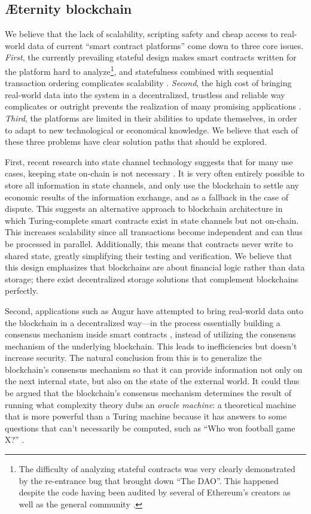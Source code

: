 \documentclass[a4paper, 10pt, conference]{ieeeconf}      %
\begin{document}
\begin{draft}
\section{Æternity blockchain}
We believe that the lack of scalability, scripting safety and cheap access to real-world data of current ``smart contract platforms'' come down to three core issues. \emph{First}, the currently prevailing stateful design makes smart contracts written for the platform hard to analyze\footnote{The difficulty of analyzing stateful contracts was very clearly demonstrated by the re-entrance bug that brought down ``The DAO''. This happened despite the code having been audited by several of Ethereum's creators as well as the general community \source.}, and statefulness combined with sequential transaction ordering complicates scalability \source. \emph{Second}, the high cost of bringing real-world data into the system in a decentralized, trustless and reliable way complicates or outright prevents the realization of many promising applications \source. \emph{Third}, the platforms are limited in their abilities to update themselves, in order to adapt to new technological or economical knowledge. We believe that each of these three problems have clear solution paths that should be explored.

First, recent research into state channel technology suggests that for many use cases, keeping state on-chain is not necessary \source. It is very often entirely possible to store all information in state channels, and only use the blockchain to settle any economic results of the information exchange, and as a fallback in the case of dispute. This suggests an alternative approach to blockchain architecture in which Turing-complete smart contracts exist in state channels but not on-chain. This increases scalability since all transactions become independent and can thus be processed in parallel. Additionally, this means that contracts never write to shared state, greatly simplifying their testing and verification. We believe that this design emphasizes that blockchains are about financial logic rather than data storage; there exist decentralized storage solutions that complement blockchains perfectly.

Second, applications such as Augur have attempted to bring real-world data onto the blockchain in a decentralized way---in the process essentially building a consensus mechanism inside smart contracts \cite{augur}, instead of utilizing the consensus mechanism of the underlying blockchain. This leads to inefficiencies but doesn't increase security. The natural conclusion from this is to generalize the blockchain's consensus mechanism so that it can provide information not only on the next internal state, but also on the state of the external world. It could thus be argued that the blockchain's consensus mechanism determines the result of running what complexity theory dubs an \emph{oracle machine}: a theoretical machine that is more powerful than a Turing machine because it has answers to some questions that can't necessarily be computed, such as ``Who won football game X?'' \source.


\end{draft}
\end{document}
